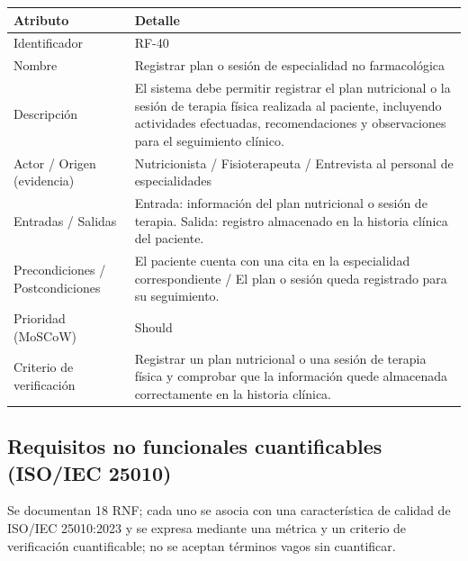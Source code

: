 \documentclass[11pt,a4paper]{article}
\begin{document}
	\begin{longtable}{p{} p{}}
		
		\toprule
		\textbf{Atributo} & \textbf{Detalle} \\
		\midrule
		\endhead
		
		Identificador & RF-40 \\
		Nombre & Registrar plan o sesión de especialidad no farmacológica \\
		Descripción & El sistema debe permitir registrar el plan nutricional o la sesión de terapia física realizada al paciente, incluyendo actividades efectuadas, recomendaciones y observaciones para el seguimiento clínico. \\
		Actor / Origen (evidencia) & Nutricionista / Fisioterapeuta / Entrevista al personal de especialidades \\
		Entradas / Salidas & Entrada: información del plan nutricional o sesión de terapia. Salida: registro almacenado en la historia clínica del paciente. \\
		Precondiciones / Postcondiciones & El paciente cuenta con una cita en la especialidad correspondiente / El plan o sesión queda registrado para su seguimiento. \\
		Prioridad (MoSCoW) & Should \\
		Criterio de verificación & Registrar un plan nutricional o una sesión de terapia física y comprobar que la información quede almacenada correctamente en la historia clínica. \\
		
		\bottomrule
		
	\end{longtable}
	
	
	\subsection{ Requisitos no funcionales cuantificables (ISO/IEC 25010)}
	
	Se documentan 18 RNF; cada uno se asocia con una característica de calidad de ISO/IEC 25010:2023 \cite{iso25010} y se expresa mediante una métrica y un criterio de verificación cuantificable; no se aceptan términos vagos sin cuantificar.
	
\end{document}
